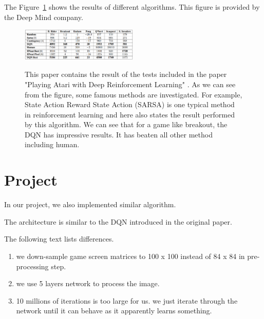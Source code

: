\documentclass{article}
\begin{document}
The Figure~\ref{result} shows the results of different algorithms. This figure is provided by the Deep Mind company\cite{mnih2013playing}.
\begin{figure}[h!]
\centering
{\includegraphics[width = 0.5\textwidth]{result}} 
\label{result}
\caption{This paper contains the result of the tests included in the paper "Playing Atari with Deep Reinforcement Learning" \cite{mnih2013playing}. As we can see from the figure, some famous methods are investigated. For example, State Action Reward State Action (SARSA) is one typical method in reinforcement learning and here also states the result performed by this algorithm. We can see that for a game like breakout, the DQN has impressive results. It has beaten all other method including human.}
\end{figure}
\section{Project}

In our project, we also implemented similar algorithm. 

The architecture is similar to the DQN introduced in the original paper. 

The following text lists differences.

\begin{enumerate}
\item we down-sample game screen matrices to 100 x 100 instead of 84 x 84 in pre-processing step.
\item we use 5 layers network to process the image.
\item 10 millions of iterations is too large for us. we just iterate through the network until it can behave as it apparently learns something.
\end{enumerate}

\end{document}
